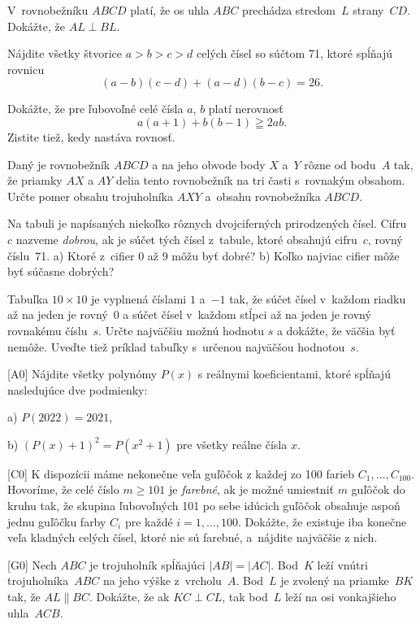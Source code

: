 {%
V~rovnobežníku $ABCD$ platí, že os uhla $ABC$ prechádza stredom~$L$ strany~$CD$. Dokážte, že $AL\perp BL$.}

{%
Nájdite všetky štvorice $a>b>c>d$ celých čísel so súčtom 71,
ktoré spĺňajú rovnicu
$$
(a-b)(c-d)+(a-d)(b-c)=26.
$$
}

{%
Dokážte, že pre ľubovoľné celé čísla $a$, $b$ platí nerovnosť
$$
a(a+1)+b(b-1)\geqq2ab.
$$
Zistite tiež, kedy nastáva rovnosť.}

{%
Daný je rovnobežník $ABCD$ a na jeho obvode body $X$ a~$Y$ rôzne
od bodu~$A$ tak, že priamky $AX$ a $AY$ delia tento rovnobežník na
tri časti s~rovnakým obsahom. Určte pomer obsahu trojuholníka $AXY$ a~obsahu rovnobežníka $ABCD$.}

{%
Na tabuli je napísaných niekoľko rôznych dvojciferných prirodzených čísel.
Cifru~$c$ nazveme {\it dobrou}, ak je súčet tých čísel
z~tabule, ktoré obsahujú cifru~$c$, rovný číslu~71.
\ite a) Ktoré z~cifier 0 až 9 môžu byť dobré?
\ite b) Koľko najviac cifier môže byť súčasne dobrých?}

{%
Tabuľka $10\times 10$ je vyplnená číslami $1$ a~${-1}$ tak, že súčet čísel
v~každom riadku až na jeden je rovný~0 a súčet čísel v~každom stĺpci až
na jeden je rovný rovnakému číslu~$s$. Určte najväčšiu možnú
hodnotu $s$ a dokážte, že väčšia byť nemôže. Uveďte tiež príklad tabuľky
s~určenou najväčšou hodnotou~$s$.}

{%
[A0]
Nájdite všetky polynómy $P(x)$ s reálnymi koeficientami, ktoré spĺňajú nasledujúce dve podmienky:
\item{a)} $P(2022)=2021$,
\item{b)} $(P(x)+1)^2=P(x^2+1)$ pre všetky reálne čísla $x$.
}

{%
[C0]
K dispozícii máme nekonečne veľa guľôčok z každej zo 100 farieb $C_1,\dots,C_{100}$. Hovoríme, že celé číslo $m\ge 101$ je {\it farebné}, ak je možné umiestniť $m$ guľôčok do kruhu tak, že skupina ľubovoľných 101 po sebe idúcich guľôčok obsahuje aspoň jednu guľôčku farby $C_i$ pre každé $i=1,\dots,100$. Dokážte, že existuje iba konečne veľa kladných celých čísel, ktoré nie sú farebné, a~nájdite najväčšie z nich.}

{%
[G0]
Nech $ABC$ je trojuholník spĺňajúci $|AB|=|AC|$. Bod~$K$ leží vnútri trojuholníka~$ABC$ na jeho výške z~vrcholu~$A$. Bod~$L$ je zvolený na priamke~$BK$ tak, že $AL \parallel BC$. Dokážte, že ak $KC \perp CL$, tak bod~$L$ leží na osi vonkajšieho uhla~$ACB$.}

